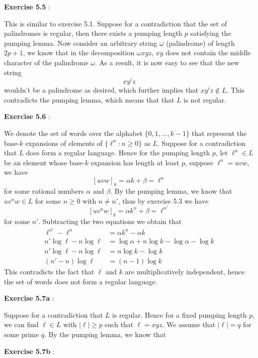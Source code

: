 \documentclass{article}
\newenvironment{solution}[1][\proofname]{
    \proof[\textbf{Solution:}] \renewcommand{\qedsymbol}{$\bell$}
}{\endproof}
\begin{document}
\noindent \textbf{Exercise 5.5} \label{exercise5.5}: 

\begin{solution}
    This is similar to exercise 5.1. Suppose for a contradiction that the set of palindromes is regular, then there exists a pumping length $p$ satisfying the pumping lemma. Now consider an arbitrary string $\omega$ (palindrome) of length $2p + 1$, we know that in the decomposition $\omega xyz$, $xy$ does not contain the middle character of the palindrome $\omega$. As a result, it is now easy to see that the new string 
    \[ x y^i z \]
    wouldn't be a palindrome as desired, which further implies that $x y^i z \notin L$. This contradicts the pumping lemma, which means that that $L$ is not regular. 
\end{solution}

\noindent \textbf{Exercise 5.6} : 

\begin{solution}
    We denote the set of words over the alphabet $\{0, 1, \ldots, k-1\}$ that represent the base-$k$ expansions of elements of $\{\ell^n : n \geq 0\}$ as $L$. Suppose for a contradiction that $L$ does form a regular language. Hence for the pumping length $p$, let $\ell^n \in L$ be an element whose base-$k$ expansion has length at least $p$, suppose $\ell^n = uvw$, we have 
    \[ [uvw]_k = \alpha k + \beta = \ell^n \]
    for some rational numbers $\alpha$ and $\beta$. By the pumping lemma, we know that $uv^nw \in L$ for some $n \geq 0$ with $n \neq n'$, thus by exercise 5.3 we have 
    \[ [uv^nw]_k = \alpha k^n + \beta = \ell^{n'} \]
    for some $n'$. Subtracting the two equations we obtain that 
    \begin{align*}
        \ell^{n'} - \ell^n & = \alpha k^n - \alpha k \\ 
        n' \log \ell - n \log \ell & = \log \alpha + n \log k - \log \alpha - \log k \\ 
        n' \log \ell - n \log \ell & = n \log k - \log k \\ 
        (n' - n) \log \ell & = (n - 1) \log k
    \end{align*}
    This contradicts the fact that $\ell$ and $k$ are multiplicatively independent, hence the set of words does not form a regular language.  
\end{solution}

\noindent \textbf{Exercise 5.7a} : 

\begin{solution}
    Suppose for a contradiction that $L$ is regular. Hence for a fixed pumping length $p$, we can find $\ell \in L$ with $|\ell| \geq p$ such that $\ell = xyz$. We assume that $|\ell| = q$ for some prime $q$. By the pumping lemma, we know that 
    \[  \]
\end{solution}

\noindent \textbf{Exercise 5.7b} : 

\begin{solution}
    
\end{solution}
\end{document}
